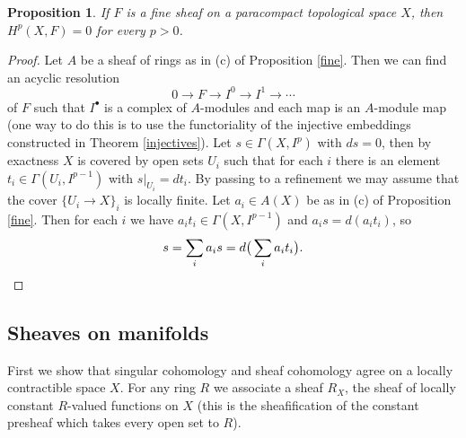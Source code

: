\documentclass[letterpaper,11pt]{article}
\newtheorem{prop}{Proposition}
\theoremstyle{definition}
\theoremstyle{remark}
\begin{document}
\begin{prop} If $F$ is a fine sheaf on a paracompact topological space $X$, then $H^p(X,F) = 0$ for every $p > 0$.
\end{prop}
\begin{proof} Let $A$ be a sheaf of rings as in (c) of Proposition \ref{fine}. Then we can find an acyclic resolution
\[
0 \rightarrow F \rightarrow I^0 \rightarrow I^1 \rightarrow \cdots
\]
of $F$ such that $I^\bullet$ is a complex of $A$-modules and each map is an $A$-module map (one way to do this is to use the functoriality of the injective embeddings constructed in Theorem \ref{injectives}). Let $s \in \Gamma(X,I^p)$ with $ds = 0$, then by exactness $X$ is covered by open sets $U_i$ such that for each $i$ there is an element $t_i \in \Gamma(U_i,I^{p-1})$ with $s|_{U_i} = dt_i$. By passing to a refinement we may assume that the cover $\{U_i \rightarrow X\}_i$ is locally finite. Let $a_i \in A(X)$ be as in (c) of Proposition \ref{fine}. Then for each $i$ we have $a_it_i \in \Gamma(X,I^{p-1})$ and $a_is = d(a_it_i)$, so
\[
s = \sum_i a_is = d\big(\sum_i a_it_i\big).\qedhere
\]
\end{proof}

\subsection{Sheaves on manifolds}

First we show that singular cohomology and sheaf cohomology agree on a locally contractible space $X$. For any ring $R$ we associate a sheaf $R_X$, the sheaf of locally constant $R$-valued functions on $X$ (this is the sheafification of the constant presheaf which takes every open set to $R$).
\end{document}
